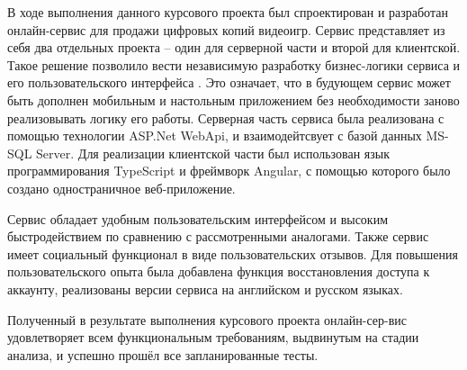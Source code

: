 
В ходе выполнения данного курсового проекта был спроектирован и разработан онлайн-сервис для продажи цифровых копий видеоигр.
Сервис представляет из себя два отдельных проекта -- один для серверной части и второй для клиентской. Такое решение позволило
вести независимую разработку бизнес-логики сервиса и его пользовательского интерфейса \cite{purival_Web}. Это означает, что в будующем сервис может
быть дополнен мобильным и настольным приложением без необходимости заново реализовывать логику его работы.
Серверная часть сервиса была реализована с помощью технологии ASP.Net WebApi, и взаимодейтсвует с базой данных MS-SQL Server.
Для реализации клиентской части был использован язык программирования TypeScript и фреймворк Angular, с помощью которого было создано
одностраничное веб-приложение.

Сервис обладает удобным пользовательским интерфейсом и высоким быстродействием по сравнению с рассмотренными аналогами. Также сервис
имеет социальный функционал в виде пользовательских отзывов. Для повышения пользовательского опыта была добавлена функция восстановления
доступа к аккаунту, реализованы версии сервиса на английском и русском языках.

Полученный в результате выполнения курсового проекта онлайн-сер-вис удовлетворяет всем функциональным требованиям, выдвинутым на
стадии анализа, и успешно прошёл все запланированные тесты.